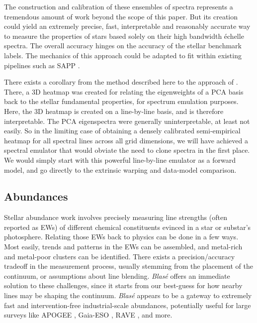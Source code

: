 \documentclass[trackchanges]{aastex631}
\begin{document}
The construction and calibration of these ensembles of spectra represents a tremendous amount of work beyond the scope of this paper.  But its creation could yield an extremely precise, fast, interpretable and reasonably accurate way to measure the properties of stars based solely on their high bandwidth \'echelle spectra.  The overall accuracy hinges on the accuracy of the stellar benchmark labels.  The mechanics of this approach could be adapted to fit within existing pipelines such as SAPP \citep{2022A&A...658A.147G}.

There exists a corollary from the method described here to the approach of \citet{czekala15}.  There, a 3D heatmap was created for relating the eigenweights of a PCA basis back to the stellar fundamental properties, for spectrum emulation purposes.  Here, the 3D heatmap is created on a line-by-line basis, and is therefore interpretable.  The PCA eigenspectra were generally uninterpretable, at least not easily.  So in the limiting case of obtaining a densely calibrated semi-empirical heatmap for all spectral lines across all grid dimensions, we will have achieved a spectral emulator that would obviate the need to clone spectra in the first place.  We would simply start with this powerful line-by-line emulator as a forward model, and go directly to the extrinsic warping and data-model comparison.



\subsection{Abundances}\label{secAbundance}

Stellar abundance work involves precisely measuring line strengths (often reported as EWs) of different chemical constituents evinced in a star or substar's photosphere.  Relating those EWs back to physics can be done in a few ways.  Most easily, trends and patterns in the EWs can be assembled, and metal-rich and metal-poor clusters can be identified.  There exists a precision/accuracy tradeoff in the measurement process, usually stemming from the placement of the continuum, or assumptions about line blending.   \emph{Blas\'e} offers an immediate solution to these challenges, since it starts from our best-guess for how nearby lines may be shaping the continuum.   \emph{Blas\'e} appears to be a gateway to extremely fast and intervention-free industrial-scale abundances, potentially useful for large surveys like APOGEE \citep{2017AJ....154...94M}, Gaia-ESO \citep{2012Msngr.147...25G}, RAVE \citep{2006AJ....132.1645S}, and more.
\end{document}
